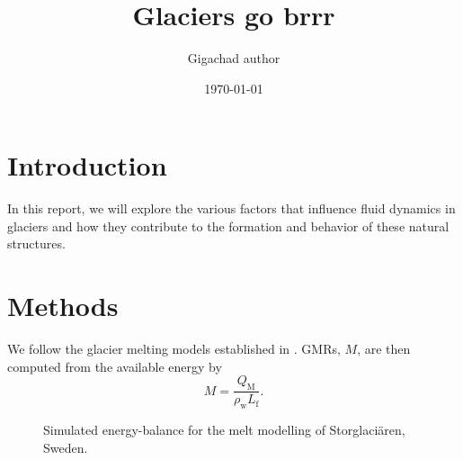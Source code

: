 \documentclass{article}
\title{Glaciers go brrr}
\author{Gigachad author}
\date{\today}
\begin{document}
\maketitle

\section{Introduction}

In this report, we will explore the
various factors that influence fluid
dynamics in glaciers and how they
contribute to the formation and
behavior of these natural structures.

\section{Methods}

We follow the glacier melting models established
in \textcite{hock2005glacier}.
\glspl{GMR}, $M$, are then computed from the available energy by
\begin{equation}
  M = \frac{Q_\text{M}}{\rho_\text{w}L_\text{f}}.
\end{equation}

\begin{figure}[h]
  \centering
  \caption{Simulated energy-balance for the melt modelling
    of Storglaciären, Sweden.}
\end{figure}

\printbibliography
\end{document}
